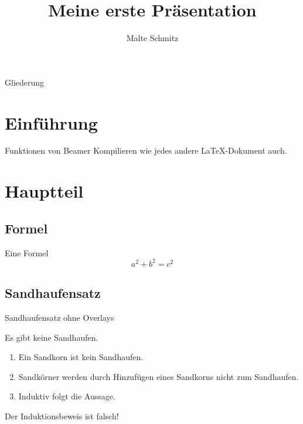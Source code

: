 \documentclass{beamer}
\title{Meine erste Präsentation}
\author{Malte Schmitz}
\begin{document}
  \begin{frame}
    \maketitle
  \end{frame}

  \begin{frame}{Gliederung}
    \tableofcontents
  \end{frame}

  \section{Einführung}

  \begin{frame}{Funktionen von Beamer}
    Kompilieren wie jedes andere
    \LaTeX-Dokument auch.
  \end{frame}

  \section{Hauptteil}

  \subsection{Formel}

  \begin{frame}{Eine Formel}
    \[ a^2 + b^2 = c^2 \]
  \end{frame}

  \subsection{Sandhaufensatz}

  \begin{frame}{Sandhaufensatz ohne Overlays}
    \begin{Satz}[Sandhaufensatz]
      Es gibt keine Sandhaufen.
    \end{Satz}

    \begin{Beweis}
      \begin{enumerate}
        \item Ein Sandkorn ist kein Sandhaufen.
        \item Sandkörner werden durch Hinzufügen eines Sandkorns nicht zum Sandhaufen.
        \item Induktiv folgt die Aussage. \qedhere
      \end{enumerate}
      \end{Beweis}

    Der Induktionsbeweis ist falsch!
  \end{frame}
\end{document}
